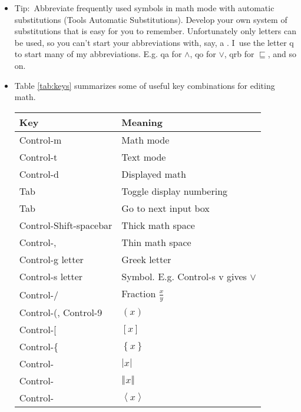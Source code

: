 \begin{itemize}
\item Tip:\ Abbreviate frequently used symbols in math mode with automatic
substitutions (Tools \TEXTsymbol{>}\TEXTsymbol{>} Automatic Substitutions).
Develop your own system of substitutions that is easy for you to remember.
Unfortunately only letters can be used, so you can't start your
abbreviations with, say, a \TEXTsymbol{\backslash} . I\ use the letter q to
start many of my abbreviations. E.g. qa for $\wedge $, qo for $\vee $, qrb
for $\sqsubseteq $, and so on.

\item Table \ref{tab:keys} summarizes some of useful key combinations for
editing math. 
\begin{table}[tbp] \centering%
\begin{singlespaced}%
\begin{tabular}{|l|l|}
\hline\hline
\multicolumn{1}{||l|}{\textbf{Key}} & \multicolumn{1}{|l||}{\textbf{Meaning}}
\\ \hline\hline
Control-m & Math mode \\ \hline
Control-t & Text mode \\ \hline
Control-d & Displayed math \\ \hline
Tab & Toggle display numbering \\ \hline
Tab & Go to next input box \\ \hline
Control-Shift-spacebar & Thick math space \\ \hline
Control-, & Thin math space \\ \hline
Control-g letter & Greek letter \\ \hline
Control-s letter & Symbol. E.g. Control-s v gives $\vee $ \\ \hline
Control-/ & Fraction $\frac{x}{y}$ \\ \hline
Control-(, Control-9 & $\left( x\right) $ \\ \hline
Control-[ & $\left[ x\right] $ \\ \hline
Control-\{ & $\left\{ x\right\} $ \\ \hline
Control-\TEXTsymbol{\backslash} & $\left\vert x\right\vert $ \\ \hline
Control-\TEXTsymbol{\vert} & $\left\Vert x\right\Vert $ \\ \hline
Control-\TEXTsymbol{<} & $\left\langle x\right\rangle $ \\ \hline

\end{tabular}
\end{singlespaced}
\end{table}
\end{itemize}
